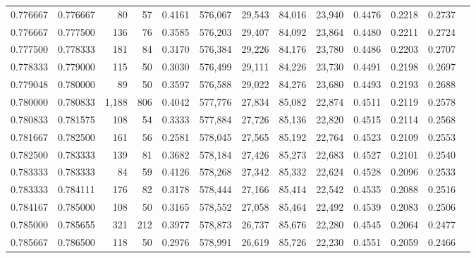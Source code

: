 \begin{tabular}{rrrrrrrrrrrrr}
0.776667 & 0.776667 &    80 &  57 &                                     0.4161 & 576,067 &  29,543 &  84,016 &  23,940 & 0.4476 & 0.2218 & 0.2737 \\
0.776667 & 0.777500 &   136 &  76 &                                     0.3585 & 576,203 &  29,407 &  84,092 &  23,864 & 0.4480 & 0.2211 & 0.2724 \\
0.777500 & 0.778333 &   181 &  84 &                                     0.3170 & 576,384 &  29,226 &  84,176 &  23,780 & 0.4486 & 0.2203 & 0.2707 \\
0.778333 & 0.779000 &   115 &  50 &                                     0.3030 & 576,499 &  29,111 &  84,226 &  23,730 & 0.4491 & 0.2198 & 0.2697 \\
0.779048 & 0.780000 &    89 &  50 &                                     0.3597 & 576,588 &  29,022 &  84,276 &  23,680 & 0.4493 & 0.2193 & 0.2688 \\
0.780000 & 0.780833 & 1,188 & 806 &                                     0.4042 & 577,776 &  27,834 &  85,082 &  22,874 & 0.4511 & 0.2119 & 0.2578 \\
0.780833 & 0.781575 &   108 &  54 &                                     0.3333 & 577,884 &  27,726 &  85,136 &  22,820 & 0.4515 & 0.2114 & 0.2568 \\
0.781667 & 0.782500 &   161 &  56 &                                     0.2581 & 578,045 &  27,565 &  85,192 &  22,764 & 0.4523 & 0.2109 & 0.2553 \\
0.782500 & 0.783333 &   139 &  81 &                                     0.3682 & 578,184 &  27,426 &  85,273 &  22,683 & 0.4527 & 0.2101 & 0.2540 \\
0.783333 & 0.783333 &    84 &  59 &                                     0.4126 & 578,268 &  27,342 &  85,332 &  22,624 & 0.4528 & 0.2096 & 0.2533 \\
0.783333 & 0.784111 &   176 &  82 &                                     0.3178 & 578,444 &  27,166 &  85,414 &  22,542 & 0.4535 & 0.2088 & 0.2516 \\
0.784167 & 0.785000 &   108 &  50 &                                     0.3165 & 578,552 &  27,058 &  85,464 &  22,492 & 0.4539 & 0.2083 & 0.2506 \\
0.785000 & 0.785655 &   321 & 212 &                                     0.3977 & 578,873 &  26,737 &  85,676 &  22,280 & 0.4545 & 0.2064 & 0.2477 \\
0.785667 & 0.786500 &   118 &  50 &                                     0.2976 & 578,991 &  26,619 &  85,726 &  22,230 & 0.4551 & 0.2059 & 0.2466 \\

\end{tabular}
